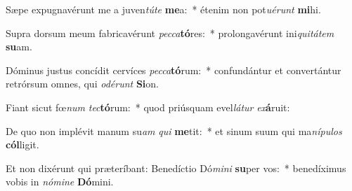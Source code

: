 \item Sæpe expugnavérunt me a juven\textit{tú}\textit{te} \textbf{me}a:~* étenim non pot\textit{u}\textit{é}\textit{runt} \textbf{mi}hi.
\item Supra dorsum meum fabricavérunt \textit{pec}\textit{ca}\textbf{tó}res:~* prolongavérunt ini\textit{qui}\textit{tá}\textit{tem} \textbf{su}am.
\item Dóminus justus concídit cervíces \textit{pec}\textit{ca}\textbf{tó}rum:~* confundántur et convertántur retrórsum omnes, qui \textit{o}\textit{dé}\textit{runt} \textbf{Si}on.
\item Fiant sicut fœ\textit{num} \textit{tec}\textbf{tó}rum:~* quod priúsquam evel\textit{lá}\textit{tur} \textit{ex}\textbf{á}ruit:
\item De quo non implévit manum su\textit{am} \textit{qui} \textbf{me}tit:~* et sinum suum qui ma\textit{ní}\textit{pu}\textit{los} \textbf{cól}ligit.
\item Et non dixérunt qui præteríbant: Benedíctio Dó\textit{mi}\textit{ni} \textbf{su}per vos:~* benedíximus vobis in \textit{nó}\textit{mi}\textit{ne} \textbf{Dó}mini.
